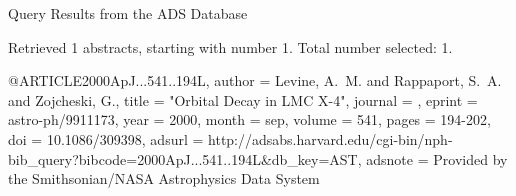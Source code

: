 Query Results from the ADS Database


Retrieved 1 abstracts, starting with number 1.  Total number selected: 1.

@ARTICLE{2000ApJ...541..194L,
   author = {{Levine}, A.~M. and {Rappaport}, S.~A. and {Zojcheski}, G.},
    title = "{Orbital Decay in LMC X-4}",
  journal = {\apj},
   eprint = {astro-ph/9911173},
     year = 2000,
    month = sep,
   volume = 541,
    pages = {194-202},
      doi = {10.1086/309398},
   adsurl = {http://adsabs.harvard.edu/cgi-bin/nph-bib_query?bibcode=2000ApJ...541..194L&db_key=AST},
  adsnote = {Provided by the Smithsonian/NASA Astrophysics Data System}
}



